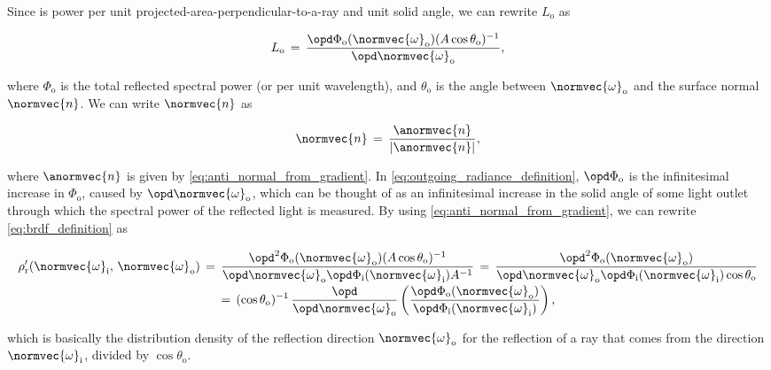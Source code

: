 Since \radiance is power per unit projected-area-perpendicular-to-a-ray and unit solid angle, we can rewrite $L_{\text{o}}$ as

\begin{equation} \label{eq:outgoing_radiance_definition}
L_{\text{o}} \,=\, \frac{\opd \Phi_{\text{o}}(\normvec{\omega}_{\text{o}})(A\cos\theta_{\text{o}})^{-1}}{\opd \normvec{\omega}_{\text{o}}},
\end{equation}

where $\Phi_{\text{o}}$ is the total reflected spectral power (or  per unit wavelength), and $\theta_{\text{o}}$ is the angle between $\normvec{\omega}_{\text{o}}$ and the surface normal $\normvec{n}$. We can write $\normvec{n}$ as

\begin{equation} \label{eq:normal_from_antinormal}
\normvec{n} \,=\, \frac{\anormvec{n}}{|\anormvec{n}|},
\end{equation}

where $\anormvec{n}$ is given by \eqref{eq:anti_normal_from_gradient}. In \eqref{eq:outgoing_radiance_definition}, $\opd \Phi_{\text{o}}$ is the infinitesimal increase in $\Phi_{\text{o}}$, caused by $\opd \normvec{\omega}_{\text{o}}$, which can be thought of as an infinitesimal increase in the solid angle of some light outlet through which the spectral power of the reflected light is measured. By using \eqref{eq:anti_normal_from_gradient}, we can rewrite \eqref{eq:brdf_definition} as

\begin{equation} \label{eq:brdf_rewritten}
\renewcommand*{\arraystretch}{2}
\begin{array}{c}
\displaystyle \rho'_{\text{r}}(\normvec{\omega}_{\text{i}},\, \normvec{\omega}_{\text{o}}) \,=\, \frac{\opd^2 \Phi_{\text{o}}(\normvec{\omega}_{\text{o}})(A\cos\theta_{\text{o}})^{-1}}{\opd \normvec{\omega}_{\text{o}}\opd \Phi_{\text{i}}(\normvec{\omega}_{\text{i}})A^{-1}} \,=\, \frac{\opd^2 \Phi_{\text{o}}(\normvec{\omega}_{\text{o}})}{\opd \normvec{\omega}_{\text{o}}\opd \Phi_{\text{i}}(\normvec{\omega}_{\text{i}})\cos\theta_{\text{o}}} \\
\displaystyle =\, (\cos\theta_{\text{o}})^{-1}\, \frac{\opd}{\opd \normvec{\omega}_{\text{o}}}\left(\frac{\opd \Phi_{\text{o}}(\normvec{\omega}_{\text{o}})}{\opd \Phi_{\text{i}}(\normvec{\omega}_{\text{i}})}\right),
\end{array}
\end{equation}

which is basically the distribution density of the reflection direction $\normvec{\omega}_{\text{o}}$ for the reflection of a ray that comes from the direction $\normvec{\omega}_{\text{i}}$, divided by $\cos\theta_{\text{o}}$.

